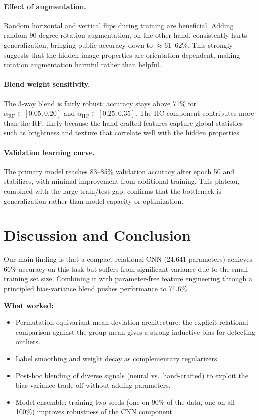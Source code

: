 \documentclass[11pt]{article}
\begin{document}
\paragraph{Effect of augmentation.}
Random horizontal and vertical flips during training are beneficial. Adding random 90-degree rotation
augmentation, on the other hand, consistently hurts generalization, bringing public accuracy down to
$\approx$61--62\%. This strongly suggests that the hidden image properties are orientation-dependent,
making rotation augmentation harmful rather than helpful.

\paragraph{Blend weight sensitivity.}
The 3-way blend is fairly robust: accuracy stays above 71\% for $\alpha_{\text{RF}} \in [0.05, 0.20]$
and $\alpha_{\text{HC}} \in [0.25, 0.35]$. The HC component contributes more than the RF, likely
because the hand-crafted features capture global statistics such as brightness and texture that correlate
well with the hidden properties.

\paragraph{Validation learning curve.}
The primary model reaches 83--85\% validation accuracy after epoch 50 and stabilizes, with minimal
improvement from additional training. This plateau, combined with the large train/test gap, confirms
that the bottleneck is generalization rather than model capacity or optimization.

\section{Discussion and Conclusion}

Our main finding is that a compact relational CNN (24{,}641 parameters) achieves 66\% accuracy on
this task but suffers from significant variance due to the small training set size. Combining it with
parameter-free feature engineering through a principled bias-variance blend pushes performance to 71.6\%.

\textbf{What worked:}
\begin{itemize}[noitemsep]
  \item Permutation-equivariant mean-deviation architecture: the explicit relational comparison against
        the group mean gives a strong inductive bias for detecting outliers.
  \item Label smoothing and weight decay as complementary regularizers.
  \item Post-hoc blending of diverse signals (neural vs.\ hand-crafted) to exploit the bias-variance
        trade-off without adding parameters.
  \item Model ensemble: training two seeds (one on 90\% of the data, one on all 100\%) improves
        robustness of the CNN component.
\end{itemize}
\end{document}
